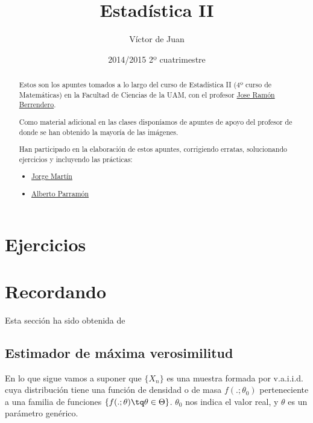 \documentclass[palatino,nochap]{apuntes}
\author{Víctor de Juan}
\date{2014/2015 2º cuatrimestre}
\title{Estadística II}
\begin{document}
\begin{abstract}

Estos son los apuntes tomados a lo largo del curso de Estadística II (4º curso de Matemáticas) en la Facultad de Ciencias de la UAM, con el profesor \href{http://www.uam.es/joser.berrendero}{Jose Ramón Berrendero}. 


Como material adicional en las clases disponíamos de apuntes de apoyo del profesor de donde se han obtenido la mayoría de las imágenes.

Han participado en la elaboración de estos apuntes, corrigiendo erratas, solucionando ejercicios y incluyendo las prácticas:

\begin{itemize}
     \item \href{https://github.com/MartinPJorge}{Jorge Martín}
     \item \href{https://github.com/AlbertoParramon}{Alberto Parramón}
 \end{itemize}  

\end{abstract}


\pagestyle{plain}
\maketitle

\tableofcontents
\newpage







\appendix
\chapter{Ejercicios}


\chapter{Recordando}
Esta sección ha sido obtenida de \citep{ApuntesEstI}

\section{Estimador de máxima verosimilitud}
\label{sec:estimadorMaximaVerosimilitud}
En lo que sigue vamos a suponer que $\{X_n\}$ es una muestra formada por v.a.i.i.d. cuya distribución tiene una función de densidad o de masa $f(.;\theta_0)$ perteneciente a una familia de funciones $\{f(.;\theta) \tq \theta \in \Theta\}$. $\theta_0$ nos indica el valor real, y $\theta$ es un parámetro genérico.
\end{document}
